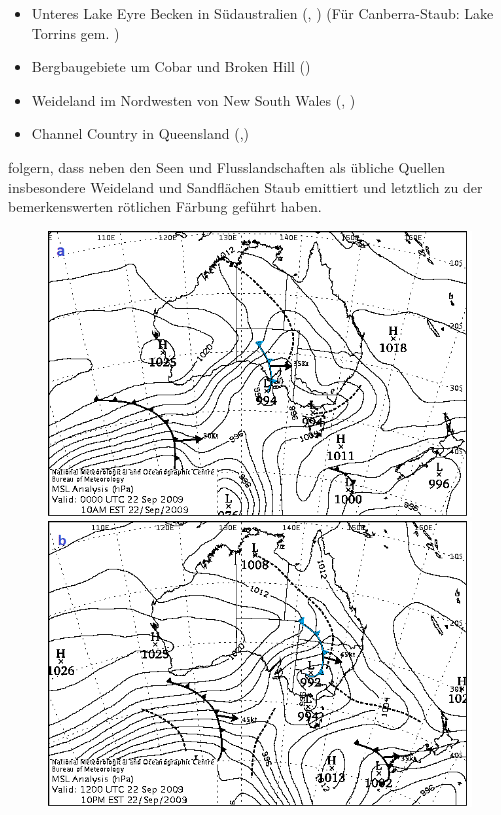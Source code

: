 \documentclass[12pt,a4paper,onecolumn]{scrartcl}
\begin{document}
\begin{itemize}
\item Unteres Lake Eyre Becken in Südaustralien (\cite{Leys.2011}, \cite{Leys.2009}) (Für Canberra-Staub: Lake Torrins gem. \cite{Deckker.2014})
\item Bergbaugebiete um Cobar und Broken Hill  (\cite{Leys.2011})
\item Weideland im Nordwesten von New South Wales (\cite{Leys.2011}, \cite{Leys.2009})
\item Channel Country in Queensland (\cite{Leys.2011},\cite{Leys.2009})
\end{itemize}
\citet{Leys.2011} folgern, dass neben den Seen und Flusslandschaften als übliche Quellen insbesondere Weideland und Sandflächen Staub emittiert und letztlich zu der bemerkenswerten rötlichen Färbung geführt haben.
\begin{figure}
	\begin{minipage}[c]{0.33\textwidth}
		\includegraphics[width=\textwidth]{bilder/reddawn/2009092200.png}
	\end{minipage}\hfill
	\begin{minipage}[c]{0.33\textwidth}
		\includegraphics[width=\textwidth]{bilder/reddawn/2009092212.png}

\end{minipage}
\end{figure}
\end{document}
